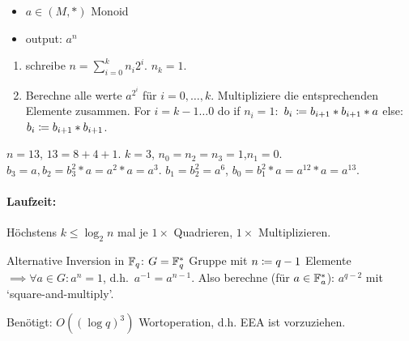 \documentclass{article}
\begin{document}
\begin{itemize}
        \item $a\in(M,\ast)$ Monoid
        \item output: $a^n$
\end{itemize}

\begin{enumerate}
        \item schreibe $n=\sum_{i=0}^k{n_i 2^i}$. $n_k=1$.
        \item Berechne alle werte $a^{2^i}$ für $i=0,\ldots,k$. Multipliziere die entsprechenden
    Elemente zusammen.
    For $i=k-1\ldots 0$ do
    if $n_i = 1:$ $b_i\mathrel{\mathrel{\mathop:}\mkern-1.2mu=} b_{i+1}\ast b_{i+1}\ast a$
    else: $b_i\mathrel{\mathrel{\mathop:}\mkern-1.2mu=} b_{i+1}\ast b_{i+1}$.
\end{enumerate}

\begin{example}
    $n=13$, $13=8+4+1$. $k=3$, $n_0=n_2=n_3=1$,$n_1=0$.
    $b_3=a, b_2=b_3^2\ast a=a^2\ast a=a^3$.
    $b_1=b_2^2=a^6$, $b_0=b_1^2\ast a=a^{12}\ast a=a^{13}$.
\end{example}

\paragraph{Laufzeit:} Höchstens $k\leq \log_2 n$ mal je $1\times$ Quadrieren, $1\times$
Multiplizieren.

Alternative Inversion in $\mathbb{F}_{q}$:
$ G=\mathbb{F}_{q}^{\ast} $
Gruppe mit $n\mathrel{\mathrel{\mathop:}\mkern-1.2mu=} q-1$ Elemente $\implies \forall a\in G:a^n=1$, d.h.~$a^{-1}=a^{n-1}$. Also
berechne (für $a\in\mathbb{F}_{a}^{\ast}$): $a^{q-2}$ mit `square-and-multiply'.

Benötigt: $O((\log q)^3)$ Wortoperation, d.h. EEA ist vorzuziehen.
\end{document}
